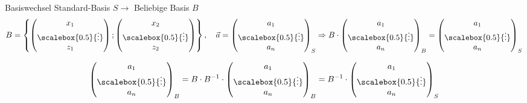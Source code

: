 \begin{KR}{Basiswechsel}
    Standard-Basis $S \rightarrow$ Beliebige Basis $B$
    $$
    B = \left\{ \begin{pmatrix} x_{1} \\ \scalebox{0.5}{\vdots} \\ z_{1} \end{pmatrix} ; \begin{pmatrix} x_{2} \\ \scalebox{0.5}{\vdots} \\ z_{2} \end{pmatrix} \right\}, \quad \vec{a} = \begin{pmatrix} a_{1} \\ \scalebox{0.5}{\vdots} \\ a_{n} \end{pmatrix}_{S} \Rightarrow B \cdot \begin{pmatrix} a_{1} \\ \scalebox{0.5}{\vdots} \\ a_{n} \end{pmatrix}_{B} = \begin{pmatrix} a_{1} \\ \scalebox{0.5}{\vdots} \\ a_{n} \end{pmatrix}_{S}
    $$

    $$
    \begin{pmatrix} a_{1} \\ \scalebox{0.5}{\vdots} \\ a_{n} \end{pmatrix}_{B} = B \cdot B^{-1} \cdot \begin{pmatrix} a_{1} \\ \scalebox{0.5}{\vdots} \\ a_{n} \end{pmatrix}_{B} = B^{-1} \cdot \begin{pmatrix} a_{1} \\ \scalebox{0.5}{\vdots} \\ a_{n} \end{pmatrix}_{S}
    $$
\end{KR}

